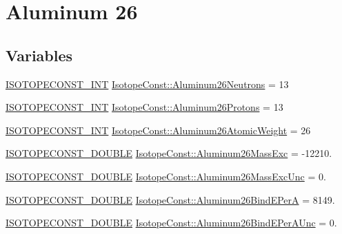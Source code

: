\hypertarget{group___isotope_const-_aluminum-_al26}{}\section{Aluminum 26}
\label{group___isotope_const-_aluminum-_al26}
\subsection*{Variables}
\begin{DoxyCompactItemize}
\item 
\mbox{\hyperlink{group___isotope_const-_macros_ga5f18360b3e99483a35c32d789e62621c}{I\+S\+O\+T\+O\+P\+E\+C\+O\+N\+S\+T\+\_\+\+I\+NT}} \mbox{\hyperlink{group___isotope_const-_aluminum-_al26_ga3c9f676103637cd6421f7ae595e9001e}{Isotope\+Const\+::\+Aluminum26\+Neutrons}} = 13
\item 
\mbox{\hyperlink{group___isotope_const-_macros_ga5f18360b3e99483a35c32d789e62621c}{I\+S\+O\+T\+O\+P\+E\+C\+O\+N\+S\+T\+\_\+\+I\+NT}} \mbox{\hyperlink{group___isotope_const-_aluminum-_al26_gacafa298d308f2c48093b132e3b9577df}{Isotope\+Const\+::\+Aluminum26\+Protons}} = 13
\item 
\mbox{\hyperlink{group___isotope_const-_macros_ga5f18360b3e99483a35c32d789e62621c}{I\+S\+O\+T\+O\+P\+E\+C\+O\+N\+S\+T\+\_\+\+I\+NT}} \mbox{\hyperlink{group___isotope_const-_aluminum-_al26_gaee4115ce74955a2cc6c482fdaf4b7cfb}{Isotope\+Const\+::\+Aluminum26\+Atomic\+Weight}} = 26
\item 
\mbox{\hyperlink{group___isotope_const-_macros_ga8f45a7272ce02c0b4c65c44636ed719a}{I\+S\+O\+T\+O\+P\+E\+C\+O\+N\+S\+T\+\_\+\+D\+O\+U\+B\+LE}} \mbox{\hyperlink{group___isotope_const-_aluminum-_al26_gae230aed5c8d6845fb1b7027af26019bd}{Isotope\+Const\+::\+Aluminum26\+Mass\+Exc}} = -\/12210.
\item 
\mbox{\hyperlink{group___isotope_const-_macros_ga8f45a7272ce02c0b4c65c44636ed719a}{I\+S\+O\+T\+O\+P\+E\+C\+O\+N\+S\+T\+\_\+\+D\+O\+U\+B\+LE}} \mbox{\hyperlink{group___isotope_const-_aluminum-_al26_ga0028915102820efdced56d7ddc496f23}{Isotope\+Const\+::\+Aluminum26\+Mass\+Exc\+Unc}} = 0.
\item 
\mbox{\hyperlink{group___isotope_const-_macros_ga8f45a7272ce02c0b4c65c44636ed719a}{I\+S\+O\+T\+O\+P\+E\+C\+O\+N\+S\+T\+\_\+\+D\+O\+U\+B\+LE}} \mbox{\hyperlink{group___isotope_const-_aluminum-_al26_gaa3359c944b69f6d83a3306ed9c28f0cb}{Isotope\+Const\+::\+Aluminum26\+Bind\+E\+PerA}} = 8149.
\item 
\mbox{\hyperlink{group___isotope_const-_macros_ga8f45a7272ce02c0b4c65c44636ed719a}{I\+S\+O\+T\+O\+P\+E\+C\+O\+N\+S\+T\+\_\+\+D\+O\+U\+B\+LE}} \mbox{\hyperlink{group___isotope_const-_aluminum-_al26_ga1d1c94f8730f9ad15a8bb08fc3cff45c}{Isotope\+Const\+::\+Aluminum26\+Bind\+E\+Per\+A\+Unc}} = 0.

\end{DoxyCompactItemize}
